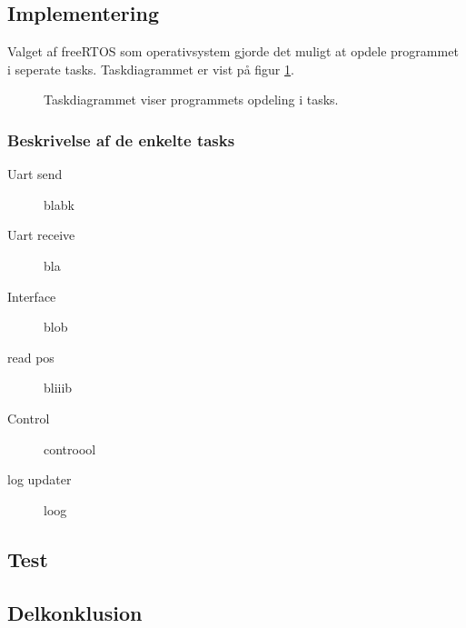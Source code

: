 \subsection{Implementering}
% 
% 

Valget af freeRTOS som operativsystem gjorde det muligt at opdele programmet i seperate tasks. Taskdiagrammet er vist på figur \ref{fig:task_diagram}. 

\begin{figure}[!h]
\centering
\begin{tikzpicture}[node distance = 3.2cm]
	
\end{tikzpicture}
\caption[Task diagram]{Taskdiagrammet viser programmets opdeling i tasks.}
\label{fig:task_diagram}
\end{figure}

\subsubsection{Beskrivelse af de enkelte tasks}
\begin{description}
	\item[Uart send] blabk
	\item[Uart receive] bla
	\item[Interface] blob
	\item[read pos] bliiib
	\item[Control] controool
	\item[log updater] loog
\end{description}





\subsection{Test} 
% 





\subsection{Delkonklusion}
